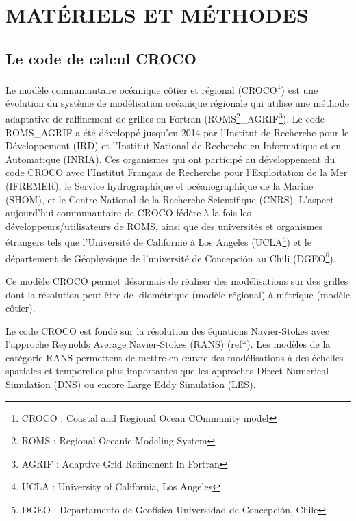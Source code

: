 \documentclass[10pt,a4paper,titlepage]{article}
\begin{document}
    
    
    \newpage
    
    \section{MATÉRIELS ET MÉTHODES}
    \label{sec:materiel_methodes}
    
    \subsection{Le code de calcul CROCO}
    \label{sub:croco}
    Le modèle communautaire océanique côtier et régional (CROCO\footnote{CROCO : Coastal and Regional Ocean COmmunity model}) est une évolution du système de modélisation océanique régionale qui utilise une méthode adaptative de raffinement de grilles en Fortran (ROMS\footnote{ROMS : Regional Oceanic Modeling System}\_AGRIF\footnote{AGRIF : Adaptive Grid Refinement In Fortran}).
    Le code ROMS\_AGRIF a été développé jusqu'en 2014 par l'Institut de Recherche pour le Développement (IRD) et l'Institut National de Recherche en Informatique et en Automatique (INRIA). Ces organismes qui ont participé au développement du code CROCO avec
    l'Institut Français de Recherche pour l'Exploitation de la Mer (IFREMER),
    le Service hydrographique et océanographique de la Marine (SHOM),
    et le Centre National de la Recherche Scientifique (CNRS).
    L'aspect aujourd'hui communautaire de CROCO fédère à la fois les développeurs/utilisateurs de ROMS, ainsi que des universités et organismes étrangers tels que l'Université de Californie à Los Angeles (UCLA\footnote{UCLA : University of California, Los Angeles})
    et le département de Géophysique de l'université de Concepción au Chili (DGEO\footnote{DGEO : Departamento de Geofísica Universidad de Concepción, Chile}).
    
    
    Ce modèle CROCO permet désormais de réaliser des modélisations sur des grilles dont la résolution peut être de kilométrique (modèle régional) à métrique (modèle côtier).
    
    Le code CROCO est fondé sur la résolution des équations Navier-Stokes avec l'approche Reynolds Average Navier-Stokes (RANS) \alert{(ref*)}.
    Les modèles de la catégorie RANS permettent de mettre en \oe{}uvre des modélisations à des échelles spatiales et temporelles plus importantes que les approches Direct Numerical Simulation (DNS) ou encore Large Eddy Simulation (LES).
    
\end{document}
